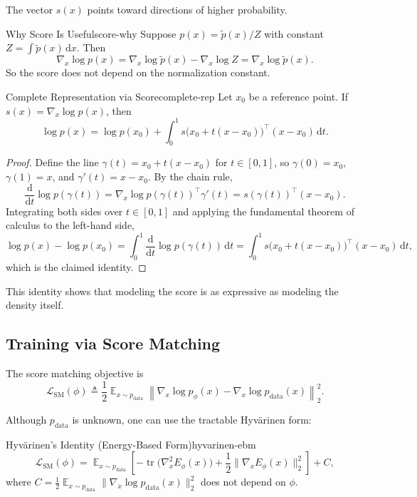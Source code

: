 \documentclass[11pt,a4paper]{article}
\newcommand{\wt}{\widetilde}
\renewcommand{\tilde}{\wt}
\renewcommand{\d}{\mathrm{d}}
\DeclareMathOperator*{\E}{\mathbb{E}}
\DeclareMathOperator{\tr}{tr}
\newcommand{\pdata}{p_{\mathrm{data}}}
\newcommand{\Ephi}{E_{\phi}}
\begin{document}
The vector $s(x)$ points toward directions of higher probability.

\begin{remark}{Why Score Is Useful}{score-why}
Suppose $p(x)=\tilde p(x)/Z$ with constant $Z=\int \tilde p(x)\,\d x$. Then
\[
\nabla_x\log p(x)
=\nabla_x\log \tilde p(x)-\nabla_x\log Z
=\nabla_x\log \tilde p(x).
\]
So the score does not depend on the normalization constant.
\end{remark}

\begin{proposition}{Complete Representation via Score}{complete-rep}
Let $x_0$ be a reference point. If $s(x)=\nabla_x\log p(x)$, then
\[
\log p(x)
=\log p(x_0)+\int_{0}^{1}
s\!\big(x_0+t(x-x_0)\big)^\top (x-x_0)\,\d t.
\]
\end{proposition}

\begin{proof}
Define the line $\gamma(t)=x_0+t(x-x_0)$ for $t\in[0,1]$, so $\gamma(0)=x_0$, $\gamma(1)=x$, and $\gamma'(t)=x-x_0$. By the chain rule,
\[
\frac{\d}{\d t}\log p(\gamma(t))
=\nabla_x\log p(\gamma(t))^\top \gamma'(t)
=s(\gamma(t))^\top (x-x_0).
\]
Integrating both sides over $t\in[0,1]$ and applying the fundamental theorem of calculus to the left-hand side,
\[
\log p(x)-\log p(x_0)
=\int_0^1 \frac{\d}{\d t}\log p(\gamma(t))\,\d t
=\int_0^1 s\!\big(x_0+t(x-x_0)\big)^\top (x-x_0)\,\d t,
\]
which is the claimed identity.
\end{proof}

This identity shows that modeling the score is as expressive as modeling the density itself.

\subsection{Training via Score Matching}

The score matching objective is
\[
\mathcal{L}_{\mathrm{SM}}(\phi)
\triangleq
\frac12 \E_{x\sim \pdata}
\left\|
\nabla_x\log p_{\phi}(x)-\nabla_x\log \pdata(x)
\right\|_2^2.
\]

Although $\pdata$ is unknown, one can use the tractable Hyv\"arinen form:

\begin{proposition}{Hyv\"arinen's Identity (Energy-Based Form)}{hyvarinen-ebm}
\[
\mathcal{L}_{\mathrm{SM}}(\phi)
=
\E_{x\sim \pdata}
\left[
-\tr\!\big(\nabla_x^2 \Ephi(x)\big)
+\frac12\|\nabla_x \Ephi(x)\|_2^2
\right]+C,
\]
where $C=\frac12\E_{x\sim\pdata}\|\nabla_x\log\pdata(x)\|_2^2$ does not depend on $\phi$.
\end{proposition}
\end{document}
